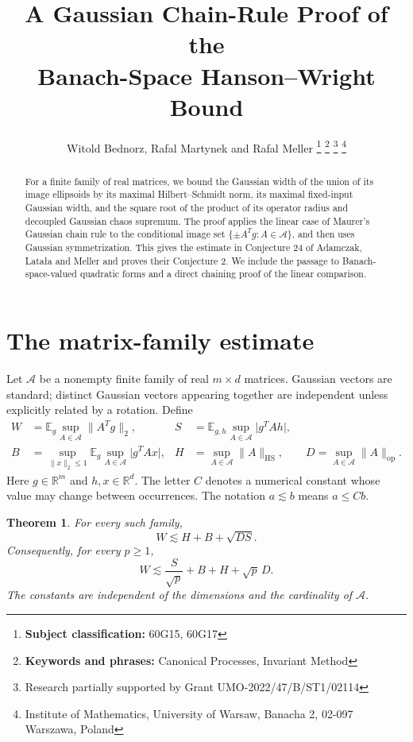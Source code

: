 \documentclass[11pt,a4paper]{article}
\title{\vspace{-7mm}A Gaussian Chain-Rule Proof of the\\Banach-Space Hanson--Wright Bound}
\author{{Witold Bednorz, Rafal Martynek and Rafal Meller}
\footnote{{\bf Subject classification:} 60G15, 60G17}
\footnote{{\bf Keywords and phrases:} Canonical Processes,  Invariant Method}
\footnote{Research partially supported by  Grant UMO-2022/47/B/ST1/02114}
\footnote{Institute of Mathematics, University of Warsaw, Banacha 2, 02-097 Warszawa, Poland}}
\date{}
\numberwithin{equation}{section}
\newtheorem{theorem}{Theorem}[section]
\theoremstyle{remark}
\newcommand{\E}{\mathbb E}
\newcommand{\R}{\mathbb R}
\newcommand{\cA}{\mathcal A}
\newcommand{\norm}[1]{\lVert #1\rVert}
\newcommand{\abs}[1]{\lvert #1\rvert}
\newcommand{\HS}{\mathrm{HS}}
\newcommand{\op}{\mathrm{op}}
\begin{document}
\maketitle
\vspace{-5mm}
\begin{abstract}
For a finite family of real matrices, we bound the Gaussian width of the union of its image ellipsoids by its maximal Hilbert--Schmidt norm, its maximal fixed-input Gaussian width, and the square root of the product of its operator radius and decoupled Gaussian chaos supremum. The proof applies the linear case of Maurer's Gaussian chain rule to the conditional image set $\{\pm A^Tg:A\in\cA\}$, and then uses Gaussian symmetrization. This gives the estimate in Conjecture 24 of Adamczak, Lata{\l}a and Meller and proves their Conjecture 2. We include the passage to Banach-space-valued quadratic forms and a direct chaining proof of the linear comparison.
\end{abstract}

\section{The matrix-family estimate}

Let $\cA$ be a nonempty finite family of real $m\times d$ matrices. Gaussian vectors are standard; distinct Gaussian vectors appearing together are independent unless explicitly related by a rotation. Define
\begin{align}
 W&=\E_g\sup_{A\in\cA}\norm{A^Tg}_2,
 &S&=\E_{g,h}\sup_{A\in\cA}\abs{g^TAh},\label{eq:WS}\\
 B&=\sup_{\norm{x}_2\le1}\E_g\sup_{A\in\cA}\abs{g^TAx},
 &H&=\sup_{A\in\cA}\norm{A}_{\HS},
 \qquad D=\sup_{A\in\cA}\norm{A}_{\op}.
 \label{eq:BHD}
\end{align}
Here $g\in\R^m$ and $h,x\in\R^d$. The letter $C$ denotes a numerical constant whose value may change between occurrences. The notation $a\lesssim b$ means $a\le Cb$.

\begin{theorem}\label{thm:main}
For every such family,
\begin{equation}
 \boxed{\quad W\lesssim H+B+\sqrt{DS}.\quad}
 \label{eq:main}
\end{equation}
Consequently, for every $p\ge1$,
\begin{equation}
 W\lesssim \frac{S}{\sqrt p}+B+H+\sqrt p\,D.
 \label{eq:pbound}
\end{equation}
The constants are independent of the dimensions and the cardinality of $\cA$.
\end{theorem}
\end{document}
